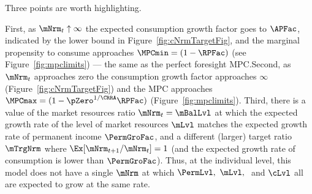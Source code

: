 \documentclass[BufferStockTheory]{subfiles}
\begin{document}
Three points are worth highlighting.  %

First, as $\mNrm_{t} \uparrow \infty$ the expected consumption growth factor goes to ${\APFac}$, indicated by the lower bound in Figure~\ref{fig:cNrmTargetFig}, and the marginal propensity to consume approaches $\MPCmin=(1-\RPFac)$ (see Figure~\ref{fig:mpclimits}) --- the same as the perfect foresight MPC.\@  Second, as $\mNrm_{t}$ approaches zero the consumption growth factor approaches $\infty$ (Figure~\ref{fig:cNrmTargetFig}) and the MPC approaches $\MPCmax=(1-\pZero^{1/\CRRA}\RPFac)$ (Figure~\ref{fig:mpclimits}).  Third, there is a value of the market resources ratio $\mNrm_{t} = \mBalLvl$ at which the expected growth rate of the level of market resources $\mLvl$ matches the expected growth rate of permanent income $\PermGroFac$, and a different (larger) target ratio $\mTrgNrm$ where $\Ex[\mNrm_{t+1}/\mNrm_{t}]=1$ (and the expected growth rate of consumption is lower than $\PermGroFac$).  Thus, at the individual level, this model does not have a single $\mNrm$ at which $\PermLvl,~\mLvl,~$ and $\cLvl$ all are expected to grow at the same rate.

\begin{comment}
  Third (Figure~\ref{fig:cNrmTargetFig}), there are two special values of $\mNrm$, which we will call the `individual balanced growth' point $\mBalLvl$ because it is the point where expected consumption growth and expected permanent income growth are balanced, and the `individual target' $\mTrgNrm$ such that if $\mNrm_t = \mTrgNrm$ then $\Ex_t [{\mNrm}_{t+1}] = \mNrm_t$.  %
  of permanent noncapital income.  (The individual consumer does not expect `balanced growth' at $\mTrgNrm$).

  The final proposition suggested by Figure~\ref{fig:cNrmTargetFig} is that the expected consumption growth factor is declining in the level of the cash-on-hand ratio $\mNrm_{t}$.  This turns out to be true in the absence of permanent shocks, but in extreme cases it can be false if permanent shocks are present.\footnote{Throughout the remaining analysis I make a final assumption that is not strictly justified by the foregoing.  We have seen that the finite-horizon consumption functions $\usual{\cFunc}_{T-n}(\mNrm)$ are twice continuously differentiable and strictly concave, and that they converge to a continuous function $\usual{\cFunc}(\mNrm)$.  It does not strictly follow that the limiting function $\usual{\cFunc}(\mNrm)$ is twice continuously differentiable, but I will assume that it is.}
\end{comment}
\end{document}
